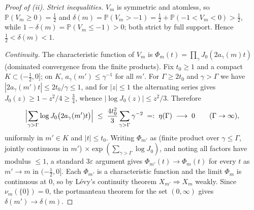 \begin{proof}[Proof of (ii)]
\emph{Strict inequalities.} $V_m$ is symmetric and atomless, so
$\mathbb P(V_m\ge0)=\tfrac12$ and
$\delta(m)=\mathbb P(V_m>-1)=\tfrac12+\mathbb P(-1<V_m<0)>\tfrac12$,
while $1-\delta(m)=\mathbb P(V_m\le-1)>0$; both strict by full
support. Hence $\tfrac12<\delta(m)<1$.

\emph{Continuity.} The characteristic function of $V_m$ is
$\Phi_m(t)=\prod_{\gamma}J_0(2a_\gamma(m)t)$ (dominated convergence
from the finite products). Fix $t_0\ge1$ and a compact
$K\subset(-\tfrac12,0]$; on $K$, $a_\gamma(m')\le\gamma^{-1}$ for
all $m'$. For $\Gamma\ge2t_0$ and $\gamma>\Gamma$ we have
$|2a_\gamma(m')t|\le 2t_0/\gamma\le1$, and for $|z|\le1$ the
alternating series gives $J_0(z)\ge1-z^2/4\ge\tfrac34$, whence
$|\log J_0(z)|\le z^2/3$. Therefore
\[
\Bigl|\sum_{\gamma>\Gamma}\log J_0\bigl(2a_\gamma(m')t\bigr)\Bigr|
\;\le\;\frac{4t_0^2}{3}\sum_{\gamma>\Gamma}\gamma^{-2}
\;=:\;\eta(\Gamma)\;\longrightarrow\;0\qquad(\Gamma\to\infty),
\]
uniformly in $m'\in K$ and $|t|\le t_0$. Writing $\Phi_{m'}$ as (finite
product over $\gamma\le\Gamma$, jointly continuous in $m'$)
$\times\exp(\sum_{\gamma>\Gamma}\log J_0)$, and noting all factors
have modulus $\le1$, a standard $3\varepsilon$ argument gives
$\Phi_{m'}(t)\to\Phi_m(t)$ for every $t$ as $m'\to m$ in
$(-\tfrac12,0]$. Each $\Phi_{m'}$ is a characteristic function and the
limit $\Phi_m$ is continuous at $0$, so by L\'evy's continuity theorem
$X_{m'}\Rightarrow X_m$ weakly. Since $\nu_m(\{0\})=0$, the
portmanteau theorem for the set $(0,\infty)$ gives
$\delta(m')\to\delta(m)$.
\end{proof}

